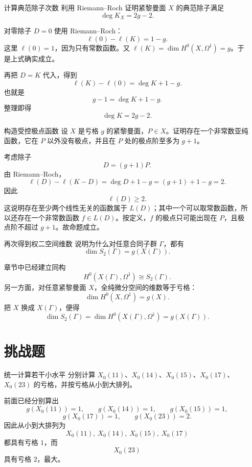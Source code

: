 \begin{problem}{计算典范除子次数}
\medium
利用 Riemann--Roch 证明紧黎曼面 $X$ 的典范除子满足
\[
\deg K_X=2g-2.
\]
\end{problem}
\begin{solution}
对零除子 $D=0$ 使用 Riemann--Roch：
\[
\ell(0)-\ell(K)=1-g.
\]
这里 $\ell(0)=1$，因为只有常数函数。又 $\ell(K)=\dim H^0(X,\Omega^1)=g$。于是上式确实成立。

再把 $D=K$ 代入，得到
\[
\ell(K)-\ell(0)=\deg K+1-g.
\]
也就是
\[
g-1=\deg K+1-g.
\]
整理即得
\[
\deg K=2g-2.
\]
\end{solution}

\begin{problem}{构造受控极点函数}
\medium
设 $X$ 是亏格 $g$ 的紧黎曼面，$P\in X$。证明存在一个非常数亚纯函数，它在 $P$ 以外没有极点，并且在 $P$ 处的极点阶至多为 $g+1$。
\end{problem}
\begin{solution}
考虑除子
\[
D=(g+1)P.
\]
由 Riemann--Roch，
\[
\ell(D)-\ell(K-D)=\deg D+1-g=(g+1)+1-g=2.
\]
因此
\[
\ell(D)\ge2.
\]
这说明存在至少两个线性无关的函数属于 $L(D)$；其中一个可以取常数函数，所以还存在一个非常数函数 $f\in L(D)$。按定义，$f$ 的极点只可能出现在 $P$，且极点阶不超过 $g+1$。故命题成立。
\end{solution}

\begin{problem}{再次得到权二空间维数}
\medium
说明为什么对任意合同子群 $\Gamma$，都有
\[
\dim S_2(\Gamma)=g(X(\Gamma)).
\]
\end{problem}
\begin{solution}
章节中已经建立同构
\[
H^0(X(\Gamma),\Omega^1)\cong S_2(\Gamma).
\]
另一方面，对任意紧黎曼面 $X$，全纯微分空间的维数等于亏格：
\[
\dim H^0(X,\Omega^1)=g(X).
\]
把 $X$ 换成 $X(\Gamma)$，便得
\[
\dim S_2(\Gamma)=\dim H^0(X(\Gamma),\Omega^1)=g(X(\Gamma)).
\]
\end{solution}

\section{挑战题 \hard}

\begin{problem}{统一计算若干小水平}
\hard
分别计算 $X_0(11)$、$X_0(14)$、$X_0(15)$、$X_0(17)$、$X_0(23)$ 的亏格，并按亏格从小到大排列。
\end{problem}
\begin{solution}
前面已经分别算出
\[
g(X_0(11))=1,
\qquad
g(X_0(14))=1,
\qquad
g(X_0(15))=1,
\]
\[
g(X_0(17))=1,
\qquad
g(X_0(23))=2.
\]
因此从小到大排列为
\[
X_0(11),\ X_0(14),\ X_0(15),\ X_0(17)
\]
都具有亏格 $1$，而
\[
X_0(23)
\]
具有亏格 $2$，最大。
\end{solution}

